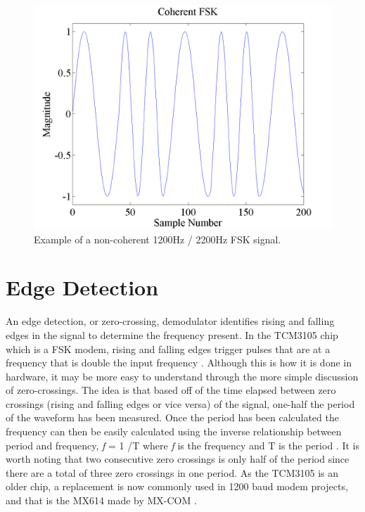 \begin{figure}
  \centering
	\includegraphics[width=0.75\linewidth]{images/CoherentFSK.png} 
	\caption{Example of a non-coherent 1200Hz / 2200Hz FSK signal.}
   \label{coherentFSKExample}
\end{figure}

\section{Edge Detection}
An edge detection, or zero-crossing, demodulator identifies rising and falling edges in the signal to determine the frequency present. In the TCM3105 chip which is a FSK modem, rising and falling edges trigger pulses that are at a frequency that is double the input frequency \cite{Instruments1994}. Although this is how it is done in hardware, it may be more easy to understand through the more simple discussion of zero-crossings. The idea is that based off of the time elapsed between zero crossings (rising and falling edges or vice versa) of the signal, one-half the period of the waveform has been measured. Once the period has been calculated the frequency can then be easily calculated using the inverse relationship between period and frequency, \textit{f} = 1 /T where \textit{f} is the frequency and T is the period \cite{Seguine2006}. It is worth noting that two consecutive zero crossings is only half of the period since there are a total of three zero crossings in one period. As the TCM3105 is an older chip, a replacement is now commonly used in 1200 baud modem projects, and that is the MX614 made by MX-COM \cite{Mitrenga2000}.

